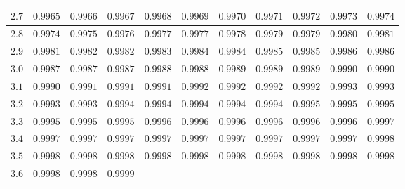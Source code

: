 \begin{customTableWrapper}{1.3}
\begin{longtable}{|l|l|l|l|l|l|l|l|l|l|l|}
    $\mathbf{2.7}$  & ${0.9965}$   & ${0.9966}$   & ${0.9967}$   & ${0.9968}$   & ${0.9969}$   & ${0.9970}$   & ${0.9971}$   & ${0.9972}$   & ${0.9973}$   & ${0.9974}$   \\ \hline
    
    $\mathbf{2.8}$  & ${0.9974}$   & ${0.9975}$   & ${0.9976}$   & ${0.9977}$   & ${0.9977}$   & ${0.9978}$   & ${0.9979}$   & ${0.9979}$   & ${0.9980}$   & ${0.9981}$   \\ \hline
    
    $\mathbf{2.9}$  & ${0.9981}$   & ${0.9982}$   & ${0.9982}$   & ${0.9983}$   & ${0.9984}$   & ${0.9984}$   & ${0.9985}$   & ${0.9985}$   & ${0.9986}$   & ${0.9986}$   \\ \hline
    
    $\mathbf{3.0}$  & ${0.9987}$   & ${0.9987}$   & ${0.9987}$   & ${0.9988}$   & ${0.9988}$   & ${0.9989}$   & ${0.9989}$   & ${0.9989}$   & ${0.9990}$   & ${0.9990}$   \\ \hline
    
    $\mathbf{3.1}$  & ${0.9990}$   & ${0.9991}$   & ${0.9991}$   & ${0.9991}$   & ${0.9992}$   & ${0.9992}$   & ${0.9992}$   & ${0.9992}$   & ${0.9993}$   & ${0.9993}$   \\ \hline
    
    $\mathbf{3.2}$  & ${0.9993}$   & ${0.9993}$   & ${0.9994}$   & ${0.9994}$   & ${0.9994}$   & ${0.9994}$   & ${0.9994}$   & ${0.9995}$   & ${0.9995}$   & ${0.9995}$   \\ \hline
    
    $\mathbf{3.3}$  & ${0.9995}$   & ${0.9995}$   & ${0.9995}$   & ${0.9996}$   & ${0.9996}$   & ${0.9996}$   & ${0.9996}$   & ${0.9996}$   & ${0.9996}$   & ${0.9997}$   \\ \hline
    
    $\mathbf{3.4}$  & ${0.9997}$   & ${0.9997}$   & ${0.9997}$   & ${0.9997}$   & ${0.9997}$   & ${0.9997}$   & ${0.9997}$   & ${0.9997}$   & ${0.9997}$   & ${0.9998}$   \\ \hline
    
    $\mathbf{3.5}$  & ${0.9998}$   & ${0.9998}$   & ${0.9998}$   & ${0.9998}$   & ${0.9998}$   & ${0.9998}$   & ${0.9998}$   & ${0.9998}$   & ${0.9998}$   & ${0.9998}$   \\ \hline
    
    $\mathbf{3.6}$  & ${0.9998}$   & ${0.9998}$   & ${0.9999}$   &         &           &       &           &       &           &       \\ \hline
\end{longtable}
\end{customTableWrapper}


\changefontsizes{10pt}










